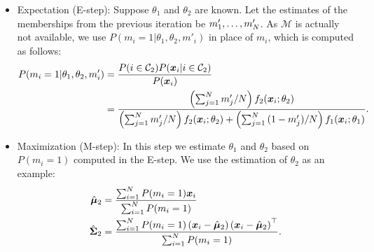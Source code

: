         \begin{itemize}
            \item Expectation (E-step): Suppose $\theta_1$ and $\theta_2$ are known. 
            Let the estimates of the memberships from the previous iteration be $m'_1, \ldots, m'_N$.
            As $\mathcal{M}$ is actually not available, we use $P(m_i=1 | \theta_1, \theta_2, m'_i)$ in place of $m_i$, which is computed as follows:
                \begin{equation}
                    \begin{aligned}
                    P(m_i=1 | \theta_1, \theta_2, m'_i) & = \frac{P(i \in \mathcal{C}_2) P(\bm{x}_i | i \in \mathcal{C}_2)}{P(\bm{x}_i)} \\
                    & = \frac{\left( \sum_{j=1}^{N}{m'_j} / N \right) f_2(\bm{x}_i; \theta_2)}{ \left( \sum_{j=1}^{N}{m'_j} / N \right) f_2(\bm{x}_i; \theta_2) + \left( \sum_{j=1}^{N}{(1-m'_j)} / N \right) f_1(\bm{x}_i; \theta_1) }.
                \end{aligned}
                \end{equation}
            \item Maximization (M-step): In this step we estimate $\theta_1$ and $\theta_2$ based on $P(m_i=1)$ computed in the E-step.
            We use the estimation of $\theta_2$ as an example:
                \begin{equation}
                    \begin{aligned}
                        \hat{\bm{\mu}}_2 & = \frac{\sum_{i=1}^{N}{P(m_i=1) \bm{x}_i}}{\sum_{i=1}^{N}{P(m_i=1)}}  \\
                        \hat{\bm{\Sigma}}_2 & = \frac{\sum_{i=1}^{N}{P(m_i=1)\left( \bm{x}_i -  \hat{\bm{\mu}}_2  \right)\left( \bm{x}_i -  \hat{\bm{\mu}}_2  \right)^\top}}{\sum_{i=1}^{N}{P(m_i=1)}}.
                    \end{aligned}
                \end{equation}
        \end{itemize}
        
